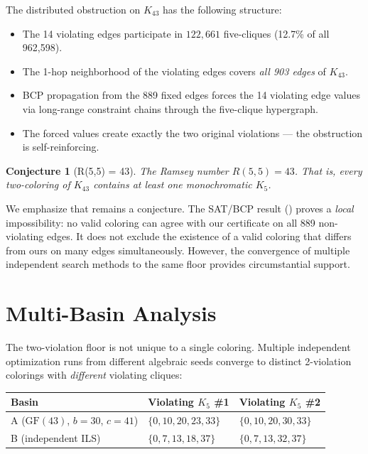 \documentclass[11pt,a4paper]{article}
\theoremstyle{plain}
\newtheorem{conjecture}[theorem]{Conjecture}
\theoremstyle{remark}
\newcommand{\GF}{\mathrm{GF}}
\begin{document}
The distributed obstruction on $K_{43}$ has the following structure:

\begin{itemize}[leftmargin=2em]
  \item The 14 violating edges participate in $122{,}661$ five-cliques
    (12.7\% of all 962{,}598).
  \item The 1-hop neighborhood of the violating edges covers
    \emph{all 903 edges} of $K_{43}$.
  \item BCP propagation from the 889 fixed edges forces the 14
    violating edge values via long-range constraint chains through
    the five-clique hypergraph.
  \item The forced values create exactly the two original violations
    --- the obstruction is self-reinforcing.
\end{itemize}

\begin{conjecture}[R(5,5) = 43]\label{conj:r55}
The Ramsey number $R(5,5) = 43$. That is, every two-coloring of
$K_{43}$ contains at least one monochromatic $K_5$.
\end{conjecture}

We emphasize that  remains a conjecture. The
SAT/BCP result () proves a \emph{local}
impossibility: no valid coloring can agree with our certificate on
all 889 non-violating edges. It does not exclude the existence of a
valid coloring that differs from ours on many edges simultaneously.
However, the convergence of multiple independent search methods to
the same floor provides circumstantial support.

\section{Multi-Basin Analysis}
\label{sec:basins}

The two-violation floor is not unique to a single coloring. Multiple
independent optimization runs from different algebraic seeds converge
to distinct 2-violation colorings with \emph{different} violating
cliques:

\begin{center}
\begin{tabular}{@{}lll@{}}
\toprule
\textbf{Basin} & \textbf{Violating $K_5$ \#1} & \textbf{Violating $K_5$ \#2} \\
\midrule
A ($\GF(43)$, $b{=}30$, $c{=}41$) &
  $\{0, 10, 20, 23, 33\}$ & $\{0, 10, 20, 30, 33\}$ \\
B (independent ILS) &
  $\{0, 7, 13, 18, 37\}$ & $\{0, 7, 13, 32, 37\}$ \\
\bottomrule
\end{tabular}
\end{center}
\end{document}
